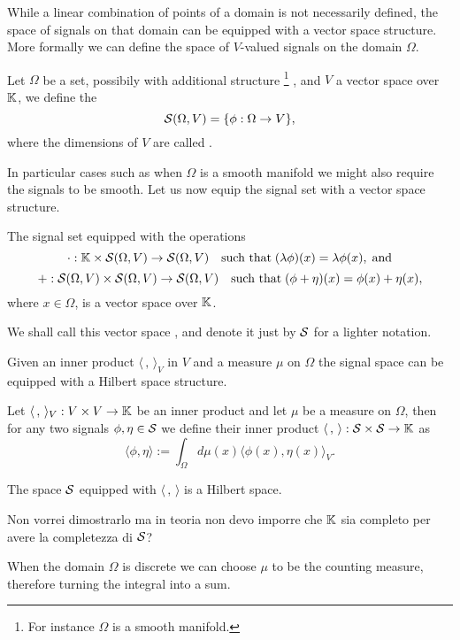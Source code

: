 \documentclass[../3.tex]{subfiles}
\begin{document}
    While a linear combination of points of a domain is not necessarily defined, the space of signals on that domain can be equipped with a vector space
    structure. More formally we can define the space of $V$-valued signals on the domain $\Omega$.

    \begin{defn}
        Let $\Omega$ be a set, possibily with additional structure
        \footnote{For instance $\Omega$ is a smooth manifold.}
        , and $V$ a vector space over $\mathbb{K}$, we define the 
        \[ \mathcal{S}(\Omega,V) = \{ \phi : \Omega \to V \}, \]
        where the dimensions of $V$ are called .
    \end{defn}

    In particular cases such as when $\Omega$ is a smooth manifold we might also require the signals to be smooth.
    Let us now equip the signal set with a vector space structure.

    \begin{prop}
        The signal set equipped with the operations
        \[ \cdot : \mathbb{K} \times \mathcal{S}(\Omega,V) \to \mathcal{S}(\Omega,V)   \quad \text{such that} \; (\lambda \phi)(x) = \lambda \phi(x), \; \text{and} \]
        \[ + : \mathcal{S}(\Omega,V) \times \mathcal{S}(\Omega,V) \to \mathcal{S}(\Omega,V) \quad \text{such that} \; (\phi + \eta)(x) = \phi(x) + \eta(x), \]
        where $x \in \Omega$, is a vector space over $\mathbb{K}$. 
    \end{prop}

    We shall call this vector space , and denote it just by $\mathcal{S}$ for
    a lighter notation.

    Given an inner product $\langle \, , \, \rangle_V$ in $V$ and a measure $\mu$ on $\Omega$ the signal space can be equipped with a Hilbert space structure.

    \begin{defn}
        Let $\langle \, , \, \rangle_V : V \times V \to \mathbb{K}$ be an inner product and let $\mu$ be a measure on $\Omega$, then for any two signals
        $\phi, \eta \in \mathcal{S}$ we define their inner product $\langle \, , \, \rangle : \mathcal{S} \times \mathcal{S} \to \mathbb{K}$ as
        \[ \langle \phi, \eta \rangle := \int_\Omega d\mu(x) \langle \phi(x), \eta(x) \rangle_V .\]
    \end{defn}

    \begin{prop}
        The space $\mathcal{S}$ equipped with $\langle \, , \, \rangle$ is a Hilbert space.
    \end{prop}
    {\color{red} Non vorrei dimostrarlo ma in teoria non devo imporre che $\mathbb{K}$ sia completo per avere la completezza di $\mathcal{S}$?}

    When the domain $\Omega$ is discrete we can choose $\mu$ to be the counting measure, therefore turning the integral into a sum.
\end{document}
